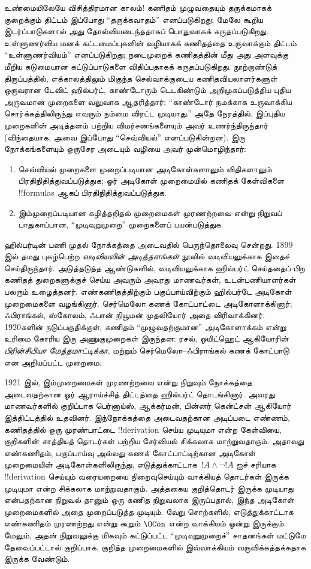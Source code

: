 \documentclass[../../../include/open-logic-section]{subfiles}
\begin{document}
உண்மையிலேயே விசித்திரமான காலம்!{} கணிதம் முழுவதையும் தருக்கமாகக் குறைக்கும்
திட்டம் இப்போது ``தருக்கவாதம்'' எனப்படுகிறது; மேலே கூறிய இடர்ப்பாடுகளால்
அது தோல்வியடைந்ததாகப் பொதுவாகக் கருதப்படுகிறது. உள்ளுணர்விய மனக்
கட்டமைப்புகளின் வழியாகக் கணிதத்தை உருவாக்கும் திட்டம் ``உள்ளுணர்வியம்''
எனப்படுகிறது; நடைமுறைக் கணிதத்தின் மீது அது அளவுக்கு மீறிய கடுமையான
கட்டுப்பாடுகளை விதிப்பதாகக் கருதப்படுகிறது. நூற்றாண்டுத் திருப்பத்தில்,
எக்காலத்திலும் மிகுந்த செல்வாக்குடைய கணிதவியலாளர்களுள் ஒருவரான டேவிட்
ஹில்பர்ட், காண்டோரும் டெடகிண்டும் அறிமுகப்படுத்திய புதிய அருவமான முறைகளை
வலுவாக ஆதரித்தார்: ``காண்டோர் நமக்காக உருவாக்கிய சொர்க்கத்திலிருந்து எவரும்
நம்மை விரட்ட முடியாது.'' அதே நேரத்தில், இப்புதிய முறைகளின் அடித்தளம் பற்றிய
விமர்சனங்களையும் அவர் உணர்ந்திருந்தார் (விந்தையாக, அவை இப்போது
``செவ்வியல்'' எனப்படுகின்றன). இரு நோக்கங்களையும் ஒருசேர அடையும் வழியை அவர்
முன்மொழிந்தார்:
\begin{enumerate}
\item செவ்வியல் முறைகளை முறைப்படியான அடிகோள்களாலும் விதிகளாலும்
  பிரதிநிதித்துவப்படுத்துக; ஓர் அடிகோள் முறைமையில் கணிதக் கேள்விகளை
  !!{formula}s ஆகப் பிரதிநிதித்துவப்படுத்துக.
\item இம்முறைப்படியான கழித்தறிதல் முறைமைகள் முரணற்றவை என்று நிறுவப்
  பாதுகாப்பான, ``முடிவுறுமுறை'' முறைகளைப் பயன்படுத்துக.
\end{enumerate}

ஹில்பர்டின் பணி முதல் நோக்கத்தை அடைவதில் பெருந்தொலைவு சென்றது. 1899 இல்
தமது புகழ்பெற்ற \emph{வடிவியலின் அடித்தளங்கள்} நூலில் வடிவியலுக்காக இதைச்
செய்திருந்தார். அடுத்தடுத்த ஆண்டுகளில், வடிவியலுக்காக ஹில்பர்ட் செய்ததைப் பிற
கணிதத் துறைகளுக்குச் செய்ய அவரும் அவரது மாணவர்கள், உடன்பணியாளர்கள் பலரும்
உழைத்தனர். எண்கணிதத்திற்கும் பகுப்பாய்விற்கும் ஹில்பர்டே அடிகோள் முறைமைகளை
வழங்கினார். செர்மெலோ கணக் கோட்பாட்டை அடிகோளாக்கினார்; ஃபிராங்கல், ஸ்கோலம்,
ஃபான் நியூமன் முதலியோர் அதை விரிவாக்கினர். 1920களின் நடுப்பகுதிக்குள்,
கணிதம் ``முழுவதற்குமான'' அடிகோளாக்கம் என்று உரிமை கோரிய இரு அணுகுமுறைகள்
இருந்தன: ரசல், ஒயிட்ஹெட் ஆகியோரின் \emph{பிரின்சிபியா மேத்தமாட்டிக்கா},
மற்றும் செர்மெலோ--ஃபிராங்கல் கணக் கோட்பாடு என அறியப்பட்ட முறைமை.

1921 இல், இம்முறைமைகள் முரணற்றவை என்று நிறுவும் நோக்கத்தை அடைவதற்கான ஓர்
ஆராய்ச்சித் திட்டத்தை ஹில்பர்ட் தொடங்கினார். அவரது மாணவர்களில் குறிப்பாக
பெர்னாய்ஸ், ஆக்கர்மன், பின்னர் கென்ட்சன் ஆகியோர் இத்திட்டத்தில் உதவினர்.
இந்நோக்கத்தை அடைவதற்கான அடிப்படை எண்ணம், கணிதத்தில் ஒரு முரண்பாட்டை
!!{derivation} செய்ய முடியுமா என்ற கேள்வியை, குறிகளின் சாத்தியத் தொடர்கள்
பற்றிய சேர்வியல் சிக்கலாக மாற்றுவதாகும். அதாவது எண்கணிதம், பகுப்பாய்வு
அல்லது கணக் கோட்பாட்டிற்கான அடிகோள் முறைமையின் அடிகோள்களிலிருந்து,
எடுத்துக்காட்டாக~$!A \land \lnot !A$ ஐச் சரியாக !!{derivation} செய்யும்
வரையறையை நிறைவுசெய்யும் வாக்கியத் தொடர்கள் இருக்க முடியுமா என்ற சிக்கலாக
மாற்றுவதாகும். அத்தகைய குறித்தொடர் இருக்க முடியாது என்பதற்கான நிறுவல் தானும்
ஒரு கணித நிறுவலாக இருப்பதால், இந்த அடிகோள் முறைமைகளில் அதை முறைப்படுத்த
முடியும். வேறு சொற்களில், எடுத்துக்காட்டாக எண்கணிதம் முரணற்றது என்று கூறும்
$\OCon$ என்ற வாக்கியம் ஒன்று இருக்கும். மேலும், அதன் நிறுவலுக்கு மிகவும்
கட்டுப்பட்ட ``முடிவுறுமுறைச்'' சாதனங்கள் மட்டுமே தேவைப்பட்டால் குறிப்பாக,
குறித்த முறைமைகளில் இவ்வாக்கியம் வருவிக்கத்தக்கதாக இருக்க வேண்டும்.
\end{document}
